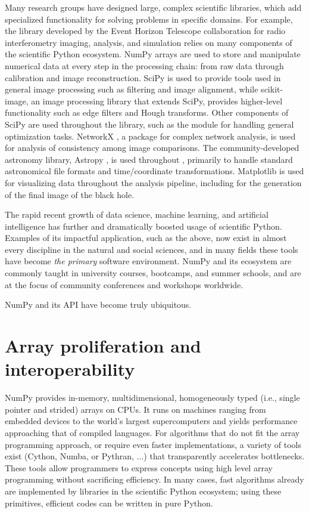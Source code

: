 Many research groups have designed large,
complex scientific libraries, which add specialized functionality for
solving problems in specific domains.
For example, the  library developed by the Event Horizon Telescope 
collaboration for radio interferometry imaging, analysis, and simulation
relies on many components of the scientific Python ecosystem.
NumPy arrays are used to store and manipulate numerical data at every step
in the processing chain: from raw data through calibration and image 
reconstruction.
SciPy is used to provide tools used in general image processing such as 
filtering and image alignment, while scikit-image, an image processing
library that extends SciPy, provides higher-level functionality such as
edge filters and Hough transforms.
Other components of SciPy are used throughout the library, such as the
 module for handling general optimization tasks.
NetworkX \cite{SciPyProceedings_11}, a package for complex
network analysis, is used for analysis of consistency among image
comparisons.
The community-developed astronomy library, Astropy \cite{astropy:2013, astropy:2018},
is used throughout , primarily to handle standard
astronomical file formats and time/coordinate transformations.
Matplotlib is used for visualizing data throughout the analysis pipeline,
including for the generation of the final image of the black hole.

The rapid recent growth of data science, machine learning, and
artificial intelligence has further and dramatically boosted usage of
scientific Python.  Examples of its impactful application, such as the
above, now exist in almost every discipline in the natural and social
sciences, and in many fields these tools have become \emph{the
primary} software environment.  NumPy and its ecosystem are commonly
taught in university courses, bootcamps, and summer schools, and are
at the focus of community conferences and workshops worldwide.

NumPy and its API have become truly ubiquitous.

\section*{Array proliferation and interoperability}

NumPy provides in-memory, multidimensional, homogeneously typed
(i.e., single pointer and strided) arrays on CPUs.
It runs on machines ranging from embedded devices to the world's
largest supercomputers  and yields performance
approaching that of compiled languages.
For algorithms that do not fit the array programming approach,
or require even faster implementations, a variety of tools exist (Cython, Numba, or Pythran, ...) that transparently accelerates bottlenecks.
These tools allow programmers to express concepts using high level array programming without sacrificing efficiency.
In many cases, fast algorithms already are implemented by libraries in the scientific Python ecosystem; using these primitives, efficient codes can be written in pure Python.

